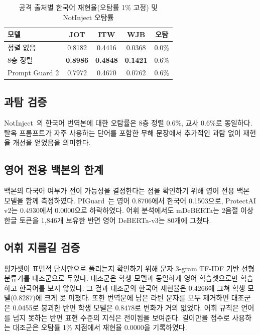 \documentclass[twocolumn, 10pt]{article}
\begin{document}
\begin{table}[t]
\caption{공격 출처별 한국어 재현율(오탐률 1\% 고정) 및 NotInject 오탐률}
\label{tab:src}
\begin{center}
\begin{tabular}{l|c|c|c|c}
\hline
모델 & JOT & ITW & WJB & 오탐 \\
\hline
정렬 없음 & 0.8182 & 0.4416 & 0.0368 & 0.0\% \\
8층 정렬 & \textbf{0.8986} & \textbf{0.4848} & \textbf{0.1421} & 0.6\% \\
Prompt Guard 2 & 0.7972 & 0.4670 & 0.0762 & 0.6\% \\
\hline
\end{tabular}
\end{center}
\end{table}

\subsection{과탐 검증}
NotInject~\cite{li:acl2025}의 한국어 번역본에 대한 오탐률은 8층 정렬 0.6\%, 교사 0.6\%로 동일하다.
탈옥 프롬프트가 자주 사용하는 단어를 포함한 무해 문장에서 추가적인 과탐 없이 재현율 개선을 얻었음을 의미한다.

\subsection{영어 전용 백본의 한계}
백본의 다국어 여부가 전이 가능성을 결정한다는 점을 확인하기 위해 영어 전용 백본 모델을 함께 측정하였다.
PIGuard~\cite{li:acl2025}는 영어 0.8706에서 한국어 0.1503으로, ProtectAI v2는 0.4930에서 0.0000으로 하락하였다.
어휘 분석에서도 mDeBERTa는 2음절 이상 한글 토큰을 1{,}846개 보유한 반면 영어 DeBERTa-v3는 80개에 그쳤다.

\subsection{어휘 지름길 검증}
평가셋이 표면적 단서만으로 풀리는지 확인하기 위해 문자 3-gram TF-IDF 기반 선형 분류기를 대조군으로 두었다.
대조군은 학생 모델과 동일하게 영어 학습셋으로만 학습하고 한국어를 보지 않았다.
그 결과 대조군의 한국어 재현율은 0.4266에 그쳐 학생 모델(0.8287)에 크게 못 미쳤다.
또한 번역문에 남은 라틴 문자를 모두 제거하면 대조군은 0.0455로 붕괴한 반면 학생 모델은 0.8478로 변화가 거의 없었다.
어휘 규칙은 언어를 넘지 못하는 반면 표현 수준의 지식은 전이됨을 보여준다.
길이만을 점수로 사용하는 대조군은 오탐률 1\% 지점에서 재현율 0.0000을 기록하였다.
\end{document}
